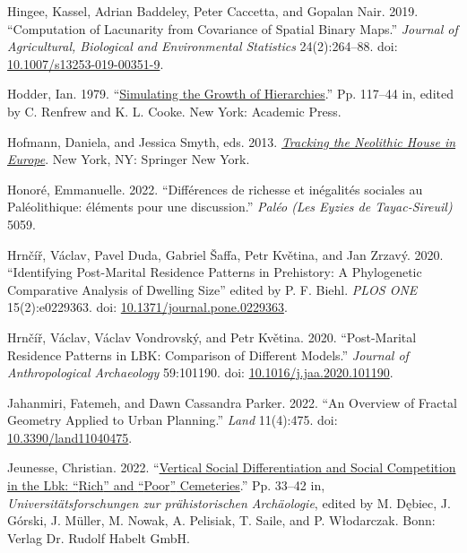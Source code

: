 \documentclass[
  12pt,
]{book}
\newlength{\cslhangindent}
\newlength{\cslentryspacingunit} %
\newenvironment{CSLReferences}[2] %
 {%
  \setlength{\parindent}{0pt}
  \ifodd #1
  \let\oldpar\par
  \def\par{\hangindent=\cslhangindent\oldpar}
  \fi
  \setlength{\parskip}{#2\cslentryspacingunit}
 }%
 {}
\begin{document}
\begin{CSLReferences}{1}{0}
\leavevmode{}%
Hingee, Kassel, Adrian Baddeley, Peter Caccetta, and Gopalan Nair. 2019. {``Computation of Lacunarity from Covariance of Spatial Binary Maps.''} \emph{Journal of Agricultural, Biological and Environmental Statistics} 24(2):264--88. doi: \href{https://doi.org/10.1007/s13253-019-00351-9}{10.1007/s13253-019-00351-9}.

\leavevmode{}%
Hodder, Ian. 1979. {``\href{https://doi.org/10.1016/B978-0-12-586050-5.50015-4}{Simulating the Growth of Hierarchies}.''} Pp. 117--44 in, edited by C. Renfrew and K. L. Cooke. New York: Academic Press.

\leavevmode{}%
Hofmann, Daniela, and Jessica Smyth, eds. 2013. \emph{\href{https://doi.org/10.1007/978-1-4614-5289-8}{Tracking the Neolithic House in Europe}}. New York, NY: Springer New York.

\leavevmode{}%
Honoré, Emmanuelle. 2022. {``Différences de richesse et inégalités sociales au Paléolithique: éléments pour une discussion.''} \emph{Paléo (Les Eyzies de Tayac-Sireuil)} 5059.

\leavevmode{}%
Hrnčíř, Václav, Pavel Duda, Gabriel Šaffa, Petr Květina, and Jan Zrzavý. 2020. {``Identifying Post-Marital Residence Patterns in Prehistory: A Phylogenetic Comparative Analysis of Dwelling Size''} edited by P. F. Biehl. \emph{PLOS ONE} 15(2):e0229363. doi: \href{https://doi.org/10.1371/journal.pone.0229363}{10.1371/journal.pone.0229363}.

\leavevmode{}%
Hrnčíř, Václav, Václav Vondrovský, and Petr Květina. 2020. {``Post-Marital Residence Patterns in LBK: Comparison of Different Models.''} \emph{Journal of Anthropological Archaeology} 59:101190. doi: \href{https://doi.org/10.1016/j.jaa.2020.101190}{10.1016/j.jaa.2020.101190}.

\leavevmode{}%
Jahanmiri, Fatemeh, and Dawn Cassandra Parker. 2022. {``An Overview of Fractal Geometry Applied to Urban Planning.''} \emph{Land} 11(4):475. doi: \href{https://doi.org/10.3390/land11040475}{10.3390/land11040475}.

\leavevmode{}%
Jeunesse, Christian. 2022. {``\href{https://www.academia.edu/95075660/Vertical_social_differentiation_and_social_competition_in_the_Lbk_rich_and_poor_cemeteries}{Vertical Social Differentiation and Social Competition in the Lbk: {``}Rich{''} and {``}Poor{''} Cemeteries}.''} Pp. 33--42 in, \emph{Universitätsforschungen zur prähistorischen Archäologie}, edited by M. Dębiec, J. Górski, J. Müller, M. Nowak, A. Pelisiak, T. Saile, and P. Włodarczak. Bonn: Verlag Dr. Rudolf Habelt GmbH.


\end{CSLReferences}
\end{document}
